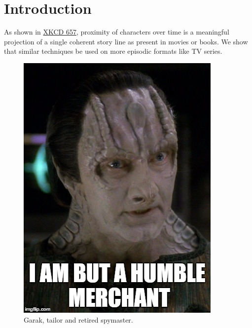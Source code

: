 

\section{Introduction}
\label{sec:papertag.introduction}

As shown in \href{https://xkcd.com/657/}{XKCD 657}, proximity of characters over time is a meaningful projection of a single coherent story line as present in movies or books. We show that similar techniques  be used on more episodic formats like TV series. 

\begin{figure}[tp!]
  \centering	
    \includegraphics[width=\columnwidth]{figures/localized/Garak.jpg}  
  \caption{
    Garak, tailor and retired spymaster.
  }
  \label{fig:papertag.}
\end{figure}


